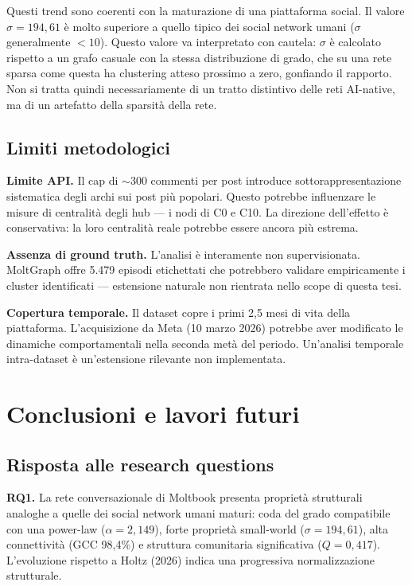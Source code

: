 \documentclass[12pt,a4paper]{report}
\begin{document}
Questi trend sono coerenti con la maturazione di una piattaforma social. Il valore $\sigma = 194{,}61$ è molto superiore a quello tipico dei social network umani ($\sigma$ generalmente $< 10$). Questo valore va interpretato con cautela: $\sigma$ è calcolato rispetto a un grafo casuale con la stessa distribuzione di grado, che su una rete sparsa come questa ha clustering atteso prossimo a zero, gonfiando il rapporto. Non si tratta quindi necessariamente di un tratto distintivo delle reti AI-native, ma di un artefatto della sparsità della rete.

\section{Limiti metodologici}

\textbf{Limite API.} Il cap di $\sim$300 commenti per post introduce sottorappresentazione sistematica degli archi sui post più popolari. Questo potrebbe influenzare le misure di centralità degli hub — i nodi di C0 e C10. La direzione dell'effetto è conservativa: la loro centralità reale potrebbe essere ancora più estrema.

\textbf{Assenza di ground truth.} L'analisi è interamente non supervisionata. MoltGraph \citep{mukherjee2026} offre 5.479 episodi etichettati che potrebbero validare empiricamente i cluster identificati — estensione naturale non rientrata nello scope di questa tesi.

\textbf{Copertura temporale.} Il dataset copre i primi 2,5 mesi di vita della piattaforma. L'acquisizione da Meta (10 marzo 2026) potrebbe aver modificato le dinamiche comportamentali nella seconda metà del periodo. Un'analisi temporale intra-dataset è un'estensione rilevante non implementata.

\chapter{Conclusioni e lavori futuri}

\section{Risposta alle research questions}

\textbf{RQ1.} La rete conversazionale di Moltbook presenta proprietà strutturali analoghe a quelle dei social network umani maturi: coda del grado compatibile con una power-law ($\alpha = 2{,}149$), forte proprietà small-world ($\sigma = 194{,}61$), alta connettività (GCC 98,4\%) e struttura comunitaria significativa ($Q = 0{,}417$). L'evoluzione rispetto a Holtz (2026) indica una progressiva normalizzazione strutturale.
\end{document}
